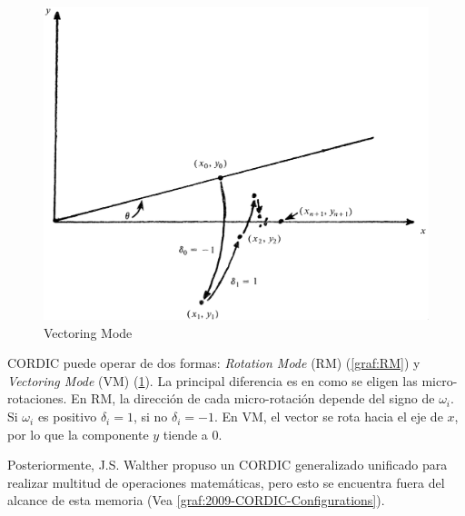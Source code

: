 \begin{figure}[ht]
	\centering
	\includegraphics[width=\textwidth]{archivos/CORDIC/VectoringMode.png}
	\caption{Vectoring Mode}
	\label{graf:VM}
\end{figure}

CORDIC puede operar de dos formas: \textit{Rotation Mode} (RM) (\ref{graf:RM}) y \textit{Vectoring Mode} (VM) (\ref{graf:VM}). La principal diferencia es en como se eligen las micro-rotaciones. En RM, la dirección de cada micro-rotación depende del signo de $\omega_{i}$. Si $\omega_{i}$ es positivo $\delta_{i} = 1$, si no $\delta_{i} = -1$. En VM, el vector se rota hacia el eje de $x$, por lo que la componente $y$ tiende a 0.

Posteriormente, J.S. Walther propuso un CORDIC generalizado unificado para realizar multitud de operaciones matemáticas, pero esto se encuentra fuera del alcance de esta memoria (Vea \ref{graf:2009-CORDIC-Configurations}).

